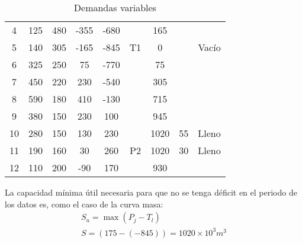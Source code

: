 \begin{table}[h!]
\begin{tabular}{@{}ccccccccc@{}}
    4   & 125          & 480      & -355      & -680      &    & 165     &         &          \\
    5   & 140          & 305      & -165      & -845      & T1 & 0       &         & Vacío    \\
    6   & 325          & 250      & 75        & -770      &    & 75      &         &          \\
    7   & 450          & 220      & 230       & -540      &    & 305     &         &          \\
    8   & 590          & 180      & 410       & -130      &    & 715     &         &          \\
    9   & 380          & 150      & 230       & 100       &    & 945     &         &          \\
    10  & 280          & 150      & 130       & 230       &    & 1020    & 55      & Lleno    \\
    11  & 190          & 160      & 30        & 260       & P2 & 1020    & 30      & Lleno    \\
    12  & 110          & 200      & -90       & 170       &    & 930     &         &          \\ \bottomrule
    \end{tabular}
    \caption{Demandas variables}
    \label{tabhs13}
    \end{table}
La capacidad mínima útil necesaria para
que no se tenga déficit en el periodo de los
datos es, como el caso de la curva masa:
\begin{align}
    S_u =\max{\left(P_j - T_l\right)}\\
    S =\left(175 -( - 845)\right) = 1020\times 10^3m^3
\end{align}




